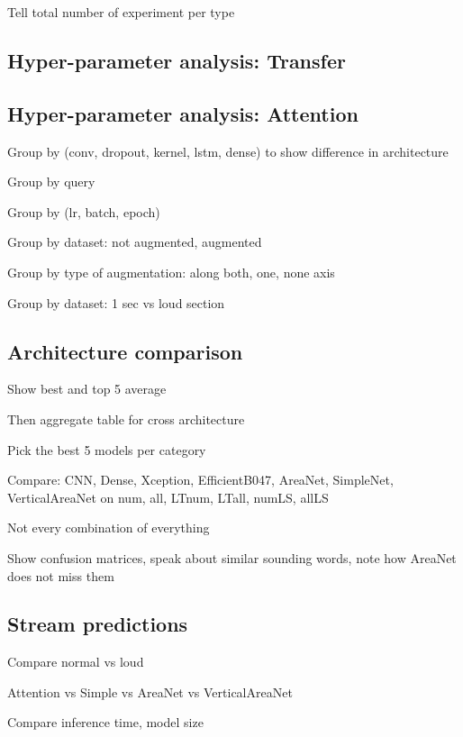 
Tell total number of experiment per type

\subsection{Hyper-parameter analysis: Transfer}

\subsection{Hyper-parameter analysis: Attention}

Group by (conv, dropout, kernel, lstm, dense) to show difference in architecture

Group by query

Group by (lr, batch, epoch)

Group by dataset: not augmented, augmented

Group by type of augmentation: along both, one, none axis

Group by dataset: 1 sec vs loud section

\subsection{Architecture comparison}

Show best and top 5 average

Then aggregate table for cross architecture

Pick the best 5 models per category

Compare: CNN, Dense, Xception, EfficientB047, AreaNet, SimpleNet,
VerticalAreaNet on num, all, LTnum, LTall, numLS, allLS

Not every combination of everything

Show confusion matrices, speak about similar sounding words, note how AreaNet
does not miss them

\subsection{Stream predictions}

Compare normal vs loud

Attention vs Simple vs AreaNet vs VerticalAreaNet

Compare inference time, model size
